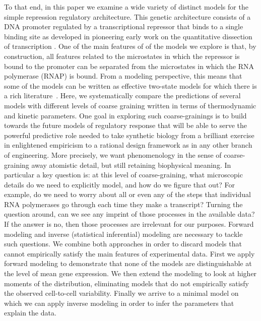To that end, in this paper we examine a wide variety of distinct models for the
simple repression regulatory architecture. This genetic architecture consists of
a DNA promoter regulated by a transcriptional repressor that binds to a single
binding site as developed in pioneering early work on the quantitative
dissection of transcription \cite{Oehler1994, Oehler1990}. One of the main
features of of the models we explore is that, by construction, all features
related to the microstates in which the repressor is bound to the promoter can
be separated from the microstates in which the RNA polymerase (RNAP) is bound.
From a modeling perspective, this means that some of the models can be written
as effective two-state models for which there is a rich
literature~\cite{Peccoud1995,Bintu2005a,Shahrezaei2008,Iyer-Biswas2009,Sanchez2013,Jones2014}.
Here, we systematically compare the predictions of several models with different
levels of coarse graining written in terms of thermodynamic and kinetic
parameters. One goal in exploring such coarse-grainings is to build towards the
future models of regulatory response that will be able to serve the powerful
predictive role needed to take synthetic biology from a brilliant exercise in
enlightened empiricism to a rational design framework as in any other branch of
engineering. More precisely, we want phenomenology in the sense of
coarse-graining away atomistic detail, but still retaining biophysical meaning.
In particular a key question is: at this level of coarse-graining, what
microscopic details do we need to explicitly model, and how do we figure that
out? For example, do we need to worry about all or even any of the steps that
individual RNA polymerases go through each time they make a transcript? Turning
the question around, can we see any imprint of those processes in the available
data? If the answer is no, then those processes are irrelevant for our purposes.
Forward modeling and inverse (statistical inferential) modeling are necessary to
tackle such questions. We combine both approaches in order to discard models 
that cannot empirically satisfy the main features of experimental data. First we
apply forward modeling to demonstrate that none of the models are 
distinguishable at the level of mean gene expression. We then extend the 
modeling to look at higher moments of the distribution, eliminating models that
do not empirically satisfy the observed cell-to-cell variability. Finally we 
arrive to a minimal model on which we can apply inverse modeling in order to 
infer the parameters that explain the data.

